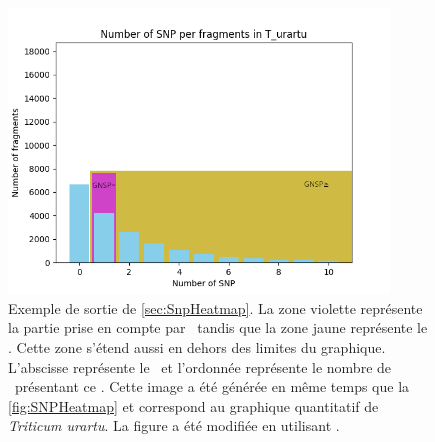\documentclass[../main]{subfiles} %
\begin{document}
\addto\extrasfrench{\protected\edef:{\unexpanded\expandafter{:}}}

\begin{figure}[ht]
    \centering
    \includegraphics[width=0.9\textwidth]{../Illustrations/ExempleTriticum.png}
    \caption{Exemple de sortie de \cref{sec:SnpHeatmap}. La zone violette représente la partie prise en compte par \GNSPeq tandis que la zone jaune représente le \GNSPge. Cette zone s'étend aussi en dehors des limites du graphique. L'abscisse représente le \NbSNP et l'ordonnée représente le nombre de \contigs présentant ce \NbSNP. Cette image a été générée en même temps que la \cref{fig:SNPHeatmap} et correspond au graphique quantitatif de \textit{Triticum urartu}. La figure a été modifiée en utilisant \gimp.}
    \label{fig:ExempleTriticum}
\end{figure}


\end{document}
